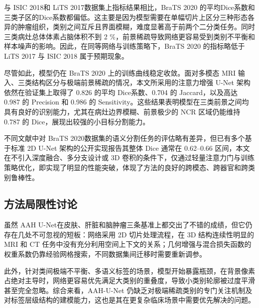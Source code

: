 与 ISIC 2018和 LiTS 2017数据集上指标结果相比，BraTS 2020 的平均Dice系数和三类子区的Dice系数都偏低。这主要是因为模型需要在单幅切片上区分三种形态各异的肿瘤组织，类别之间互斥且界面模糊，难度显著高于前两个二分类任务。同时三类病灶总体体素占脑体积不到 2 \%，前景稀疏导致网络更容易受到类别不平衡和样本噪声的影响。因此，在同等网络与训练策略下，BraTS 2020 的指标略低于 LiTS 2017 与 ISIC 2018 属于预期现象。

尽管如此，模型仍在 BraTS 2020 上的训练曲线稳定收敛。面对多模态 MRI 输入、三类结构区分与极端前景稀疏的情况，本文所采用的注意力增强 U-Net 架构依然在验证集上取得了 0.826 的平均 Dice系数、0.704 的 Jaccard，以及高达 0.987 的 Precision 和 0.986 的 Sensitivity。这些结果表明模型在三类前景之间均具有良好的识别能力，尤其在病灶边界模糊、前景极少的 NCR 区域仍能维持 0.787 的 Dice，展现出较强的小目标分割能力。

不同文献中对 BraTS 2020数据集的语义分割任务的评估略有差异\cite{islam2020,wang2021,menze2015}，但已有多个基于标准 2D U-Net 架构的公开实现报告其整体 Dice 通常在 0.62–0.66 区间，本文在不引入深度融合、多分支设计或 3D 卷积的条件下，仅通过轻量注意力门与训练策略优化，即实现了明显的性能突破，体现了方法的良好的跨模态、跨器官和跨类别鲁棒性。

\subsection{方法局限性讨论}

虽然 AAH U-Net在皮肤、肝脏和脑肿瘤三条基准上都交出了不错的成绩，但它仍存在几处不可忽视的短板：网络采用 2D 切片处理流程，在 3D 结构连续性明显的 MRI 和 CT 任务中没有充分利用空间上下文的关系；几何增强与混合损失函数的权重系数仍靠经验网格搜索，不同数据集间迁移时需要重新调参。

此外，针对类间极端不平衡、多语义标签的场景，模型开始暴露瓶颈，在背景像素占绝对主导时，网络更容易优先满足大类别的重叠度，导致小类别轮廓被过度平滑甚至完全忽略。综合来看，AAH-U-Net 仍缺乏对极端稀疏类别的专门关注机制及对标签层级结构的建模能力，这也是其在更复杂临床场景中需要优先解决的问题。
